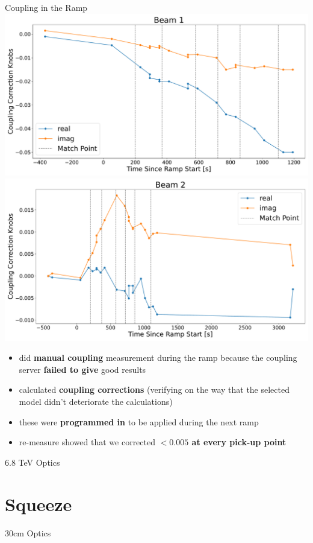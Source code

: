 \documentclass[11pt,usenames,dvipsnames,aspectration=169]{beamer}
\newcommand{\highl}[1]{\textbf{#1}}
\begin{document}
\begin{frame}{Coupling in the Ramp}
\includegraphics[width=0.49\linewidth]{images/ramp/B1_coupling_correction_knobs_in_ramp.pdf}
\hfill
\includegraphics[width=0.49\linewidth]{images/ramp/B2_coupling_correction_knobs_in_ramp.pdf}

\begin{itemize}
    \item %
did \highl{manual coupling} measurement during the ramp because the coupling server
\highl{failed to give} good results 
    \item %
calculated \highl{coupling corrections} (verifying on the way that the selected model didn't deteriorate the calculations)
    \item %
these were \highl{programmed in} to be applied during the next ramp
    \item %
re-measure showed that we corrected \highl{$< 0.005$ at every pick-up point}
\end{itemize}
\end{frame}

\begin{frame}{6.8 TeV Optics}

\end{frame}

\section{Squeeze}

\begin{frame}{30cm Optics}
    
\end{frame}

\end{document}

